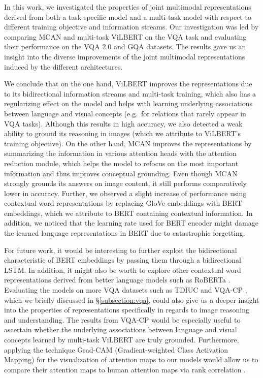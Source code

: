 \documentclass{article}
\begin{document}
In this work, we investigated the properties of joint multimodal representations derived from both a task-specific model and a multi-task model with respect to different training objective and information streams. Our investigation was led by comparing MCAN and multi-task ViLBERT on the VQA task and evaluating their performance on the VQA 2.0 and GQA datasets. The results gave us an insight into the diverse improvements of the joint multimodal representations induced by the different architectures. 

We conclude that on the one hand, ViLBERT improves the representations due to its bidirectional information streams and multi-task training, which also has a regularizing effect on the model and helps with learning underlying associations between language and visual concepts (e.g.\ for relations that rarely appear in VQA tasks). Although this results in high accuracy, we also detected a weak ability to ground its reasoning in images (which we attribute to ViLBERT's training objective). On the other hand, MCAN improves the representations by summarizing the information in various attention heads with the attention reduction module, which helps the model to refocus on the most important information and thus improves conceptual grounding. Even though MCAN strongly grounds its answers on image content, it still performs comparatively lower in accuracy. Further, we observed a slight increase of performance using contextual word representations by replacing GloVe embeddings with BERT embeddings, which we attribute to BERT containing contextual information. In addition, we noticed that the learning rate used for BERT encoder might damage the learned language representations in BERT due to catastrophic forgetting. 

For future work, it would be interesting to further exploit the bidirectional characteristic of BERT embeddings by passing them through a bidirectional LSTM. In addition, it might also be worth to explore other contextual word representations derived from better language models such as RoBERTa \citep{liu2019roberta}. %
Evaluating the models on more VQA datasets such as TDIUC \citep{kafle2017tdiuc} and VQA-CP \citep{agrawal12018gvqa}, which we briefly discussed in \S \ref{subsection:vqa}, could also give us a deeper insight into the properties of representations specifically in regards to image reasoning and understanding. The results from VQA-CP would be especially useful to ascertain whether the underlying associations between language and visual concepts learned by multi-task ViLBERT are truly grounded. Furthermore, applying the technique Grad-CAM (Gradient-weighted Class Activation Mapping) \citep{selvaraju2017gradcam} for the visualization of attention maps to our models would allow us to compare their attention maps to human attention maps via rank correlation \citep{das2016human}.
\end{document}
